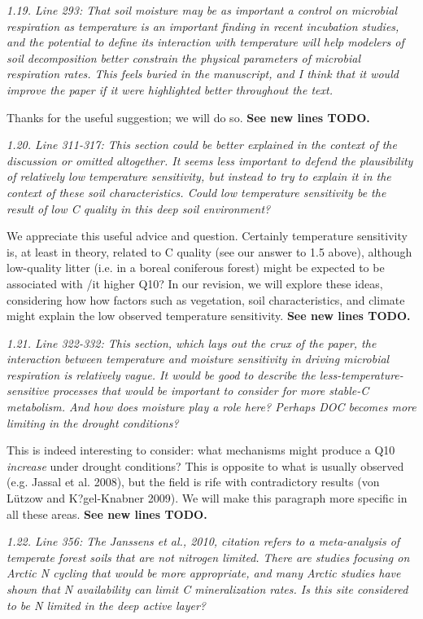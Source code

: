 \documentclass[11pt, oneside]{article}
\begin{document}
\medskip
{\it 1.19. Line 293: That soil moisture may be as important a control on microbial respiration as temperature is an important finding in recent incubation studies, and the potential to define its interaction with temperature will help modelers of soil decomposition better constrain the physical parameters of microbial respiration rates. This feels buried in the manuscript, and I think that it would improve the paper if it were highlighted better throughout the text. }

Thanks for the useful suggestion; we will do so. {\bf See new lines TODO.}

\medskip
{\it 1.20. Line 311-317: This section could be better explained in the context of the discussion or omitted altogether. It seems less important to defend the plausibility of relatively low temperature sensitivity, but instead to try to explain it in the context of these soil characteristics. Could low temperature sensitivity be the result of low C quality in this deep soil environment? }

We appreciate this useful advice and question. Certainly temperature sensitivity is, at least in theory, related to C quality (see our answer to 1.5 above), although low-quality litter (i.e. in a boreal coniferous forest) might be expected to be associated with {/it higher} Q10? In our revision, we will explore these ideas, considering how how factors such as vegetation, soil characteristics, and climate might explain the low observed temperature sensitivity. {\bf See new lines TODO.}

\medskip
{\it 1.21. Line 322-332: This section, which lays out the crux of the paper, the interaction between temperature and moisture sensitivity in driving microbial respiration is relatively vague. It would be good to describe the less-temperature-sensitive processes that would be important to consider for more stable-C metabolism. And how does moisture play a role here? Perhaps DOC becomes more limiting in the drought conditions? }

This is indeed interesting to consider: what mechanisms might produce a Q10 {\it increase} under drought conditions? This is opposite to what is usually observed (e.g. Jassal et al. 2008), but the field is rife with contradictory results (von Lützow and K?gel-Knabner 2009). We will make this paragraph more specific in all these areas. {\bf See new lines TODO.}

\medskip
{\it 1.22. Line 356: The Janssens et al., 2010, citation refers to a meta-analysis of temperate forest soils that are not nitrogen limited. There are studies focusing on Arctic N cycling that would be more appropriate, and many Arctic studies have shown that N availability can limit C mineralization rates. Is this site considered to be N limited in the deep active layer? }
\end{document}
